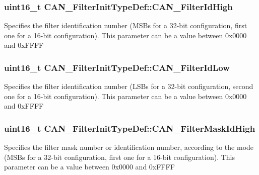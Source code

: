 \subsubsection[{C\+A\+N\+\_\+\+Filter\+Id\+High}]{\setlength{\rightskip}{0pt plus 5cm}uint16\+\_\+t C\+A\+N\+\_\+\+Filter\+Init\+Type\+Def\+::\+C\+A\+N\+\_\+\+Filter\+Id\+High}\label{struct_c_a_n___filter_init_type_def_afc109aa8eedced09d296605f2eb871f7}
Specifies the filter identification number (M\+S\+Bs for a 32-\/bit configuration, first one for a 16-\/bit configuration). This parameter can be a value between 0x0000 and 0x\+F\+F\+F\+F \hypertarget{struct_c_a_n___filter_init_type_def_ab8c56b48ac323e8c7a1b535c79a51f87}{}
\subsubsection[{C\+A\+N\+\_\+\+Filter\+Id\+Low}]{\setlength{\rightskip}{0pt plus 5cm}uint16\+\_\+t C\+A\+N\+\_\+\+Filter\+Init\+Type\+Def\+::\+C\+A\+N\+\_\+\+Filter\+Id\+Low}\label{struct_c_a_n___filter_init_type_def_ab8c56b48ac323e8c7a1b535c79a51f87}
Specifies the filter identification number (L\+S\+Bs for a 32-\/bit configuration, second one for a 16-\/bit configuration). This parameter can be a value between 0x0000 and 0x\+F\+F\+F\+F \hypertarget{struct_c_a_n___filter_init_type_def_a6f34539615e6484f266b46aa8f362a91}{}
\subsubsection[{C\+A\+N\+\_\+\+Filter\+Mask\+Id\+High}]{\setlength{\rightskip}{0pt plus 5cm}uint16\+\_\+t C\+A\+N\+\_\+\+Filter\+Init\+Type\+Def\+::\+C\+A\+N\+\_\+\+Filter\+Mask\+Id\+High}\label{struct_c_a_n___filter_init_type_def_a6f34539615e6484f266b46aa8f362a91}
Specifies the filter mask number or identification number, according to the mode (M\+S\+Bs for a 32-\/bit configuration, first one for a 16-\/bit configuration). This parameter can be a value between 0x0000 and 0x\+F\+F\+F\+F \hypertarget{struct_c_a_n___filter_init_type_def_a0f052daf04b0a481ecfa5c2cc8058089}{}
